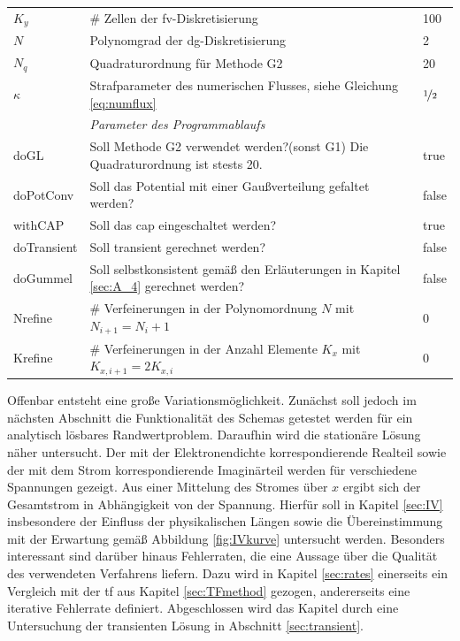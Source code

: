 \begin{table}
\begin{tabular}{p{} p{} p{}  }
    $K_y$ & \# Zellen der \ac{fv}-Diskretisierung & 100 \\
    $N$ & Polynomgrad der \ac{dg}-Diskretisierung & 2 \\
    $N_q$ & Quadraturordnung für Methode G2 & 20 \\
    $\kappa$ & Strafparameter des numerischen Flusses, siehe Gleichung \eqref{eq:numflux} &$\nicefrac{1}{2}$ \\
    \midrule
     & \emph{Parameter des Programmablaufs} & \\
    doGL & Soll Methode G2 verwendet werden?(sonst G1) Die Quadraturordnung ist stests 20. & true \\
    doPotConv & Soll das Potential mit einer Gaußverteilung gefaltet werden? & false\\
    withCAP & Soll das \ac{cap} eingeschaltet werden? & true \\
    doTransient & Soll transient gerechnet werden? & false \\
    doGummel & Soll selbstkonsistent gemäß den Erläuterungen in Kapitel \ref{sec:A_4} gerechnet werden? & false \\
    Nrefine  & \# Verfeinerungen in der Polynomordnung $N$ mit $N_{i+1}=N_i+1$ & 0 \\
    Krefine  & \# Verfeinerungen in der Anzahl Elemente $K_x$ mit $K_{x,i+1}=2K_{x,i}$ & 0 \\
    \bottomrule
  \end{tabular}
\end{table}
Offenbar entsteht eine große Variationsmöglichkeit. Zunächst soll jedoch im nächsten Abschnitt die Funktionalität des Schemas getestet werden für ein analytisch lösbares Randwertproblem. Daraufhin wird die stationäre Lösung näher untersucht. Der mit der Elektronendichte korrespondierende Realteil sowie der mit dem Strom korrespondierende Imaginärteil werden für verschiedene Spannungen gezeigt. Aus einer Mittelung des Stromes über $x$ ergibt sich der Gesamtstrom in Abhängigkeit von der Spannung. Hierfür soll in Kapitel \ref{sec:IV} insbesondere der Einfluss der physikalischen Längen sowie die Übereinstimmung mit der Erwartung gemäß Abbildung \ref{fig:IVkurve} untersucht werden. Besonders interessant sind darüber hinaus Fehlerraten, die eine Aussage über die Qualität des verwendeten Verfahrens liefern. Dazu wird in Kapitel \ref{sec:rates} einerseits ein Vergleich mit der \ac{tf} aus Kapitel \ref{sec:TFmethod} gezogen, andererseits eine iterative Fehlerrate definiert. Abgeschlossen wird das Kapitel durch eine Untersuchung der transienten Lösung in Abschnitt \ref{sec:transient}.

